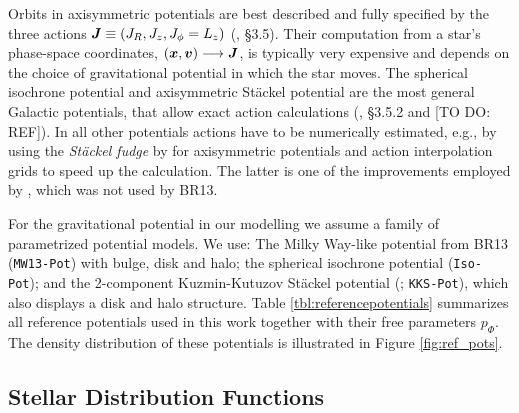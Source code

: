Orbits in axisymmetric potentials are best described and fully specified by the three actions $\boldsymbol{J} \equiv (J_R, J_z, J_\phi=L_z)$ (\citealt{2008gady.book.....B}, \S 3.5). Their computation from a star's phase-space coordinates, $(\boldsymbol{x},\boldsymbol{v}) \longrightarrow \boldsymbol{J}$, is typically very expensive and depends on the choice of gravitational potential in which the star moves. The spherical isochrone potential \citep{1959AnAp...22..126H} and axisymmetric St\"{a}ckel potential \Wilma{[TO DO: REF]} are the most general Galactic potentials, that allow exact action calculations (\citealt{2008gady.book.....B}, \S 3.5.2 and [TO DO: REF]). In all other potentials actions have to be numerically estimated, e.g., by using the \emph{St\"{a}ckel fudge} by \citet{2012MNRAS.426.1324B} for axisymmetric potentials and action interpolation grids \citep{2015ApJS..216...29B} to speed up the calculation. The latter is one of the improvements employed by \RM{}, which was not used by BR13.

For the gravitational potential in our modelling we assume a family of parametrized potential models. We use: The Milky Way-like potential from BR13 (\texttt{MW13-Pot}) with bulge, disk and halo; the spherical isochrone potential (\texttt{Iso-Pot}); and the 2-component Kuzmin-Kutuzov St\"{a}ckel potential (\citealt{1994AA...287...43B}; \texttt{KKS-Pot}), which also displays a disk and halo structure. Table \ref{tbl:referencepotentials} summarizes all reference potentials used in this work together with their free parameters $p_\Phi$. The density distribution of these potentials is illustrated in Figure \ref{fig:ref_pots}.\\




\subsection{Stellar Distribution Functions} \label{sec:qDF}

